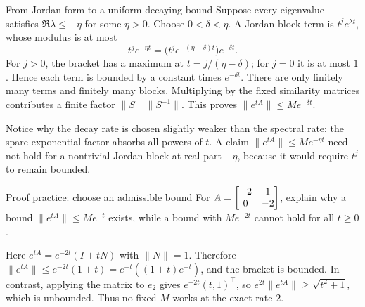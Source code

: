 \begin{concept}{From Jordan form to a uniform decaying bound}
Suppose every eigenvalue satisfies $\Re\lambda\leq-\eta$ for some $\eta>0$. Choose $0<\delta<\eta$. A Jordan-block term is $t^je^{\lambda t}$, whose modulus is at most
\[t^je^{-\eta t}=\big(t^je^{-(\eta-\delta)t}\big)e^{-\delta t}.\]
For $j>0$, the bracket has a maximum at $t=j/(\eta-\delta)$; for $j=0$ it is at most $1$. Hence each term is bounded by a constant times $e^{-\delta t}$. There are only finitely many terms and finitely many blocks. Multiplying by the fixed similarity matrices contributes a finite factor $\|S\|\|S^{-1}\|$. This proves $\|e^{tA}\|\leq Me^{-\delta t}$.

Notice why the decay rate is chosen slightly weaker than the spectral rate: the spare exponential factor absorbs all powers of $t$. A claim $\|e^{tA}\|\leq Me^{-\eta t}$ need not hold for a nontrivial Jordan block at real part $-\eta$, because it would require $t^j$ to remain bounded.
\end{concept}
\begin{question}{Proof practice: choose an admissible bound}
For $A=\begin{bmatrix}-2&1\\0&-2\end{bmatrix}$, explain why a bound $\|e^{tA}\|\leq Me^{-t}$ exists, while a bound with $Me^{-2t}$ cannot hold for all $t\geq0$.
\end{question}
\begin{answer}
Here $e^{tA}=e^{-2t}(I+tN)$ with $\|N\|=1$. Therefore $\|e^{tA}\|\leq e^{-2t}(1+t)=e^{-t}((1+t)e^{-t})$, and the bracket is bounded. In contrast, applying the matrix to $e_2$ gives $e^{-2t}(t,1)^{\top}$, so $e^{2t}\|e^{tA}\|\geq\sqrt{t^2+1}$, which is unbounded. Thus no fixed $M$ works at the exact rate $2$.
\end{answer}

